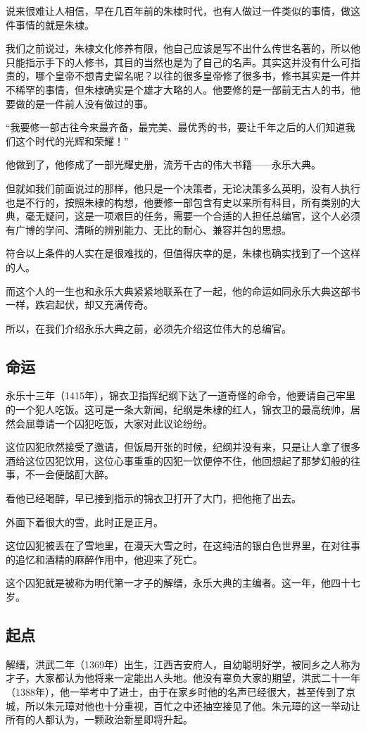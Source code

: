 \begin{multicols}{\theparacolNo}
说来很难让人相信，早在几百年前的朱棣时代，也有人做过一件类似的事情，做这件事情的就是朱棣。

我们之前说过，朱棣文化修养有限，他自己应该是写不出什么传世名著的，所以他只能指示手下的人修书，其目的当然也是为了自己的名声。其实这并没有什么可指责的，哪个皇帝不想青史留名呢？以往的很多皇帝修了很多书，修书其实是一件并不稀罕的事情，但朱棣确实是个雄才大略的人。他要修的是一部前无古人的书，他要做的是一件前人没有做过的事。

“我要修一部古往今来最齐备，最完美、最优秀的书，要让千年之后的人们知道我们这个时代的光辉和荣耀！”

他做到了，他修成了一部光耀史册，流芳千古的伟大书籍——永乐大典。

但就如我们前面说过的那样，他只是一个决策者，无论决策多么英明，没有人执行也是不行的，按照朱棣的构想，他要修一部包含有史以来所有科目，所有类别的大典，毫无疑问，这是一项艰巨的任务，需要一个合适的人担任总编官，这个人必须有广博的学问、清晰的辨别能力、无比的耐心、兼容并包的思想。

符合以上条件的人实在是很难找的，但值得庆幸的是，朱棣也确实找到了一个这样的人。

而这个人的一生也和永乐大典紧紧地联系在了一起，他的命运如同永乐大典这部书一样，跌宕起伏，却又充满传奇。

所以，在我们介绍永乐大典之前，必须先介绍这位伟大的总编官。

\subsection{命运}
永乐十三年（1415年），锦衣卫指挥纪纲下达了一道奇怪的命令，他要请自己牢里的一个犯人吃饭。这可是一条大新闻，纪纲是朱棣的红人，锦衣卫的最高统帅，居然会屈尊请一个囚犯吃饭，大家对此议论纷纷。

这位囚犯欣然接受了邀请，但饭局开张的时候，纪纲并没有来，只是让人拿了很多酒给这位囚犯饮用，这位心事重重的囚犯一饮便停不住，他回想起了那梦幻般的往事，不一会便酩酊大醉。

看他已经喝醉，早已接到指示的锦衣卫打开了大门，把他拖了出去。

外面下着很大的雪，此时正是正月。

这位囚犯被丢在了雪地里，在漫天大雪之时，在这纯洁的银白色世界里，在对往事的追忆和酒精的麻醉作用中，他迎来了死亡。

这个囚犯就是被称为明代第一才子的解缙，永乐大典的主编者。这一年，他四十七岁。

\subsection{起点}
解缙，洪武二年（1369年）出生，江西吉安府人，自幼聪明好学，被同乡之人称为才子，大家都认为他将来一定能出人头地。他没有辜负大家的期望，洪武二十一年（1388年），他一举考中了进士，由于在家乡时他的名声已经很大，甚至传到了京城，所以朱元璋对他也十分重视，百忙之中还抽空接见了他。朱元璋的这一举动让所有的人都认为，一颗政治新星即将升起。


\end{multicols}
